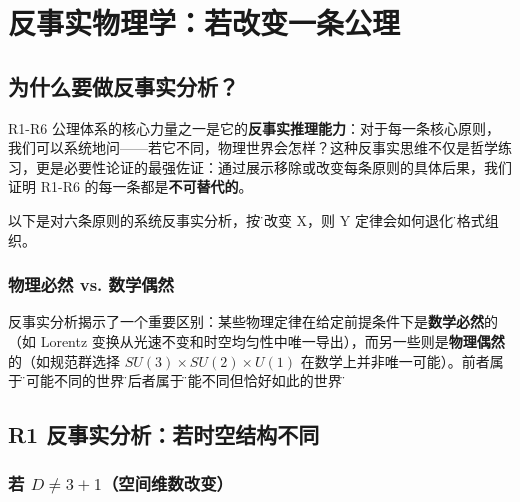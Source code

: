 \chapter{反事实物理学：若改变一条公理}
\label{app:counterfactual}

\section*{为什么要做反事实分析？}

R1-R6 公理体系的核心力量之一是它的\textbf{反事实推理能力}：对于每一条核心原则，我们可以系统地问——若它不同，物理世界会怎样？这种反事实思维不仅是哲学练习，更是必要性论证的最强佐证：通过展示移除或改变每条原则的具体后果，我们证明 R1-R6 的每一条都是\textbf{不可替代的}。

以下是对六条原则的系统反事实分析，按\"若改变 X，则 Y 定律会如何退化\"的格式组织。

\subsection*{物理必然 vs. 数学偶然}

反事实分析揭示了一个重要区别：某些物理定律在给定前提条件下是\textbf{数学必然}的（如 Lorentz 变换从光速不变和时空均匀性中唯一导出），而另一些则是\textbf{物理偶然}的（如规范群选择 $SU(3)\times SU(2)\times U(1)$ 在数学上并非唯一可能）。前者属于\"不可能不同的世界\"，后者属于\"可能不同但恰好如此的世界\"。

\section{R1 反事实分析：若时空结构不同}

\subsection{若 $D \neq 3+1$（空间维数改变）}

